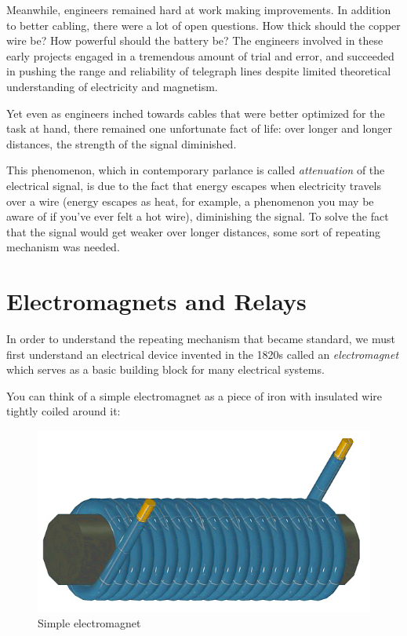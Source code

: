 \documentclass[UTF8]{book}
\begin{document}
\begin{CJK}{UTF8}{gbsn}
Meanwhile, engineers remained hard at work making improvements. In addition to better cabling, there were a lot of open questions. How thick should the copper wire be? How powerful should the battery be? The engineers involved in these early projects engaged in a tremendous amount of trial and error, and succeeded in pushing the range and reliability of telegraph lines despite limited theoretical understanding of electricity and magnetism.

Yet even as engineers inched towards cables that were better optimized for the task at hand, there remained one unfortunate fact of life: over longer and longer distances, the strength of the signal diminished.

This phenomenon, which in contemporary parlance is called \emph{attenuation} of the electrical signal, is due to the fact that energy escapes when electricity travels over a wire (energy escapes as heat, for example, a phenomenon you may be aware of if you've ever felt a hot wire), diminishing the signal. To solve the fact that the signal would get weaker over longer distances, some sort of repeating mechanism was needed.

\section{Electromagnets and Relays}

In order to understand the repeating mechanism that became standard, we must first understand an electrical device invented in the 1820s called an \emph{electromagnet} which serves as a basic building block for many electrical systems.

You can think of a simple electromagnet as a piece of iron with insulated wire tightly coiled around it:

\begin{figure}[H]
\centering
\includegraphics[width=0.8\linewidth]{electromagnet}
\caption{Simple electromagnet}
\end{figure}


\end{CJK}
\end{document}

